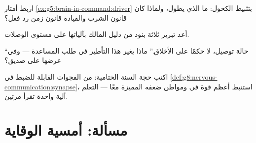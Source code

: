 \begin{exercise}[$\star\star$]\label{exo:g8:protecting-the-nervous-system:9}
اربط أمتار \cref{ex:g5:brain-in-command:driver} بتثبيط
الكحول: ما الذي يطول، ولماذا كان قانون الشرب والقيادة
قانون زمن رد فعل؟
\end{exercise}

\begin{exercise}[$\star\star$]\label{exo:g8:protecting-the-nervous-system:10}
أعد تبرير ثلاثة بنود من دليل المالك بآلياتها على مستوى
الوصلات.
\end{exercise}

\begin{exercise}[$\star\star$]\label{exo:g8:protecting-the-nervous-system:11}
``حالة توصيل، لا حكمًا على الأخلاق.'' ماذا يغير هذا
التأطير في طلب المساعدة --- وفي عرضها على صديق؟
\end{exercise}

\begin{exercise}[$\star\star\star$]\label{exo:g8:protecting-the-nervous-system:12}
اكتب حجة السنة الختامية: من الفجوات القابلة للضبط في
\cref{def:g8:nervous-communication:synapse}، استنبط أعظم
قوة في  ومواطن ضعفه المميزة معًا --- التعلم
 آلية واحدة تقرأ مرتين.
\end{exercise}

\section{مسألة: أمسية الوقاية}

